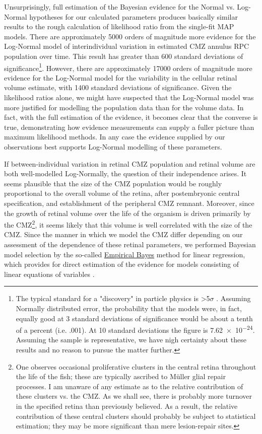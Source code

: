 Unsurprisingly, full estimation of the Bayesian evidence for the Normal vs. Log-Normal hypotheses for our calculated parameters produces basically similar results to the rough calculation of likelihood ratio from the single-fit MAP models. There are approximately 5000 orders of magnitude more evidence for the Log-Normal model of interindividual variation in estimated CMZ annulus RPC population over time. This result has greater than 600 standard deviations of significance\footnote{The typical standard for a "discovery" in particle physics is >5$\sigma$ \cite{Lyons2013}. Assuming Normally distributed error, the probability that the models were, in fact, equally good at 3 standard deviations of significance would be about a tenth of a percent (i.e. .001). At 10 standard deviations the figure is \num{7.62e-24}. Assuming the sample is representative, we have nigh certainty about these results and no reason to pursue the matter further.}. However, there are approximately 17000 orders of magnitude more evidence for the Log-Normal model for the variability in the cellular retinal volume estimate, with 1400 standard deviations of significance. Given the likelihood ratios alone, we might have suspected that the Log-Normal model was more justified for modelling the population data than for the volume data. In fact, with the full estimation of the evidence, it becomes clear that the converse is true, demonstrating how evidence measurements can supply a fuller picture than maximum likelihood methods. In any case the evidence supplied by our observations best supports Log-Normal modelling of these parameters.

If between-individual variation in retinal CMZ population and retinal volume are both well-modelled Log-Normally, the question of their independence arises. It seems plausible that the size of the CMZ population would be roughly proportional to the overall volume of the retina, after postembryonic central specification, and establishment of the peripheral CMZ remnant. Moreover, since the growth of retinal volume over the life of the organism is driven primarily by the CMZ\footnote{One observes occasional proliferative clusters in the central retina throughout the life of the fish; these are typically ascribed to M\"{u}ller glial repair processes. I am unaware of any estimate as to the relative contribution of these clusters vs. the CMZ. As we shall see, there is probably more turnover in the specified retina than previously believed. As a result, the relative contribution of these central clusters should probably be subject to statistical estimation; they may be more significant than mere lesion-repair sites.}, it seems likely that this volume is well correlated with the size of the CMZ. Since the manner in which we model the CMZ differ depending on our assessment of the dependence of these retinal parameters, we performed Bayesian model selection by the so-called \hyperref[ssec:EmpiricalBayes]{Empirical Bayes} method for linear regression, which provides for direct estimation of the evidence for models consisting of linear equations of variables \cite{Bishop2006}.

